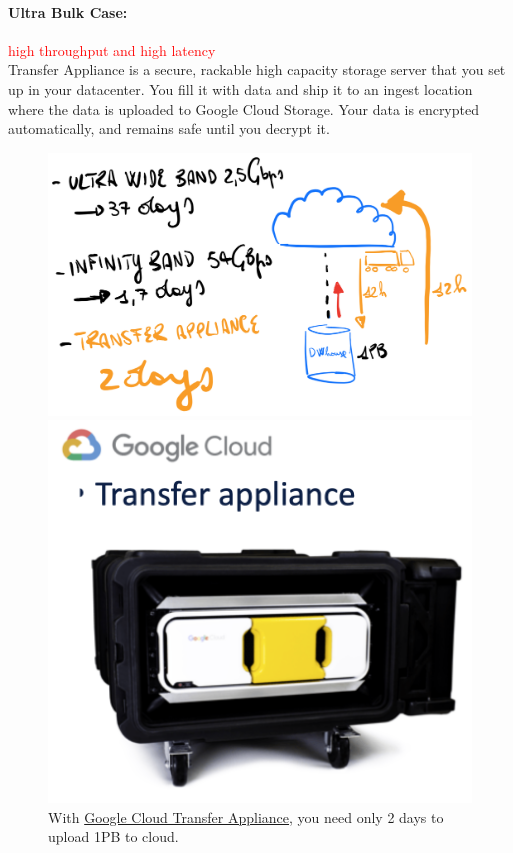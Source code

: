 \documentclass[10pt,a4paper]{article}
\begin{document}
\paragraph{Ultra Bulk Case:} \textcolor{red}{high throughput and high latency} \\
Transfer Appliance is a secure, rackable high capacity storage server that you set up in your datacenter. You fill it with data and ship it to an ingest location where the data is uploaded to Google Cloud Storage. Your data is encrypted automatically, and remains safe until you decrypt it.

 \begin{figure}[ht!]
\centering
\begin{minipage}{.5\textwidth}
  \centering
  \includegraphics[width=.6\linewidth]{images/ultra-bulk}
\end{minipage}%
\begin{minipage}{.5\textwidth}
  \centering
  \includegraphics[width=.6\linewidth]{images/google-cloud-transfer}
\end{minipage}
\caption{With \href{https://cloud.google.com/transfer-appliance/}{Google Cloud Transfer Appliance}, you need only 2 days to upload 1PB to cloud.}
\end{figure}
\end{document}
